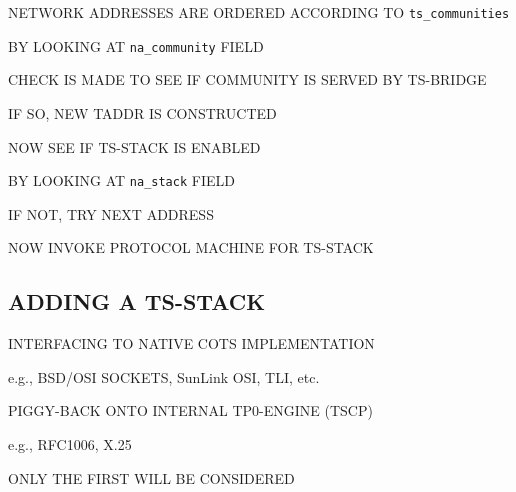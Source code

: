 \begin{bwslide}

\begin{nrtc}
\item	NETWORK ADDRESSES ARE ORDERED ACCORDING TO \verb"ts_communities"
    \begin{nrtc}
    \item	BY LOOKING AT \verb"na_community" FIELD
    \end{nrtc}
\end{nrtc}
\end{bwslide}


\begin{bwslide}

\begin{nrtc}
\item	CHECK IS MADE TO SEE IF COMMUNITY IS SERVED BY TS-BRIDGE
    \begin{nrtc}
    \item	IF SO, NEW TADDR IS CONSTRUCTED
    \end{nrtc}

\item	NOW SEE IF TS-STACK IS ENABLED
    \begin{nrtc}
    \item	BY LOOKING AT \verb"na_stack" FIELD
    \end{nrtc}
    IF NOT, TRY NEXT ADDRESS

\item	NOW INVOKE PROTOCOL MACHINE FOR TS-STACK
\end{nrtc}
\end{bwslide}


\begin{bwslide}
\part	{ADDING A TS-STACK}\bf

\begin{nrtc}
\item	INTERFACING TO NATIVE COTS IMPLEMENTATION
    \begin{nrtc}
    \item	e.g., BSD/OSI SOCKETS, SunLink OSI, TLI, etc.
    \end{nrtc}

\item	PIGGY-BACK ONTO INTERNAL TP0-ENGINE (TSCP)
    \begin{nrtc}
    \item	e.g., RFC1006, X.25
    \end{nrtc}

\item	ONLY THE FIRST WILL BE CONSIDERED
\end{nrtc}
\end{bwslide}


